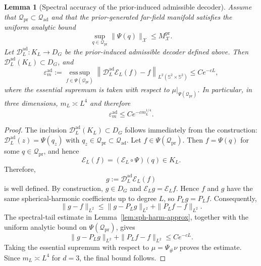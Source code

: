 \documentclass{article}
\numberwithin{equation}{section}
\theoremstyle{plain}
\newtheorem{lemma}{Lemma}[section]
\begin{document}
	\begin{lemma}[Spectral accuracy of the prior-induced admissible decoder]
	\label{lem:admissible-lifting}
	Assume that $\mathcal Q_{\mathrm{pr}}\subset \mathcal Q_{\mathrm{ad}}$ and that the prior-generated far-field manifold satisfies the uniform analytic bound
	\begin{equation*}
	\sup_{q\in\mathcal Q_{\mathrm{pr}}}\|\Psi(q)\|_{\mathcal X}\le M_{\mathcal X}^{\mathrm{pr}}.
	\end{equation*}
	Let $\mathcal D_L^{\mathrm{ad}}:K_L\to D_G$ be the prior-induced admissible decoder defined above. Then $\mathcal D_L^{\mathrm{ad}}(K_L)\subset D_G$, and
	\begin{equation*}
		\varepsilon_m^{\mathrm{ad}}
		:=
		\operatorname*{ess\,sup}_{f\in\Psi(\mathcal Q_{\mathrm{pr}})}
		\left\|
		\mathcal D_L^{\mathrm{ad}}\mathcal E_L(f)-f
		\right\|_{L^2(\mathbb S^2\times\mathbb S^2)}
		\le Ce^{-cL},
	\end{equation*}
	where the essential supremum is taken with respect to
	$\mu|_{\Psi(\mathcal Q_{\mathrm{pr}})}$.
	In particular, in three dimensions, $m_L\asymp L^4$ and therefore
	\begin{equation*}
	\varepsilon_m^{\mathrm{ad}}\le Ce^{-c m_L^{1/4}}.
	\end{equation*}
	\end{lemma}

	\begin{proof}
	The inclusion $\mathcal D_L^{\mathrm{ad}}(K_L)\subset D_G$ follows immediately from the construction: $\mathcal D_L^{\mathrm{ad}}(z)=\Psi(q_z)$ with $q_z\in \mathcal Q_{\mathrm{pr}}\subset\mathcal Q_{\mathrm{ad}}$.
	Let $f\in\Psi(\mathcal Q_{\mathrm{pr}})$. Then
	$f=\Psi(q)$ for some $q\in\mathcal Q_{\mathrm{pr}}$, and hence
	\begin{equation*}
		\mathcal E_L(f)
		=
		(\mathcal E_L\circ\Psi)(q)
		\in K_L.
	\end{equation*}
	Therefore,
	\begin{equation*}
		g:=\mathcal D_L^{\mathrm{ad}}\mathcal E_L(f)
	\end{equation*}
	is well defined.
	By construction, $g\in D_G$ and $\mathcal E_L g=\mathcal E_L f$. Hence $f$ and $g$ have the same spherical-harmonic coefficients up to degree $L$, so $P_Lg=P_Lf$. Consequently,
	\begin{equation*}
	\|g-f\|_{L^2}
	\le \|g-P_Lg\|_{L^2}+\|P_Lf-f\|_{L^2}.
	\end{equation*}
	The spectral-tail estimate in Lemma~\ref{lem:sph-harm-approx}, together with the uniform analytic bound on $\Psi(\mathcal Q_{\mathrm{pr}})$, gives
	\begin{equation*}
	\|g-P_Lg\|_{L^2}+\|P_Lf-f\|_{L^2}\le Ce^{-cL}.
	\end{equation*}
	Taking the essential supremum with respect to $\mu=\Psi_{\#}\nu$ proves the estimate. Since $m_L\asymp L^4$ for $d=3$, the final bound follows.
	\end{proof}
	
\end{document}

